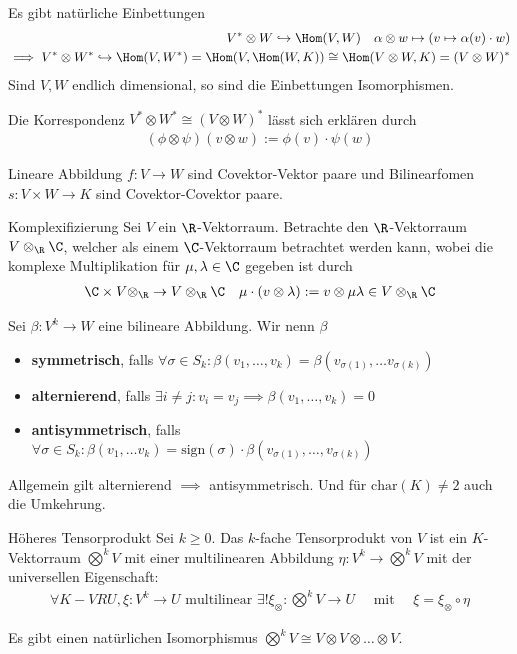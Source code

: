 \begin{proposition}{}
    Es gibt natürliche Einbettungen
    \begin{align*}
        V^* \otimes W \hookrightarrow \Hom(V,W) \quad \alpha \otimes w \mapsto (v \mapsto \alpha(v) \cdot w)\\
        \implies V^* \otimes W^* \hookrightarrow \Hom(V,W^*) = \Hom(V, \Hom(W,K)) \cong \Hom(V \otimes W,K) = (V \otimes W)^*
    \end{align*}
    Sind $V,W$ endlich dimensional, so sind die Einbettungen Isomorphismen.

    Die Korrespondenz $V^* \otimes W^* \cong (V \otimes W)^*$ lässt sich erklären durch
    \begin{align*}
        (\phi \otimes \psi)(v \otimes w) := \phi(v) \cdot \psi(w)
    \end{align*}
\end{proposition}
Lineare Abbildung $f: V \to W$ sind Covektor-Vektor paare und Bilinearfomen $s: V \times W \to K$ sind Covektor-Covektor paare.

\begin{satz}{Komplexifizierung}
    Sei $V$ ein $\R$-Vektorraum. Betrachte den $\R$-Vektorraum $V \otimes_{\R} \C$, welcher als einem $\C$-Vektorraum betrachtet werden kann, wobei die komplexe Multiplikation für $\mu, \lambda \in \C$ gegeben ist durch
    \begin{align*}
        \C \times V \otimes_{\R} \to V \otimes_{\R} \C \quad \mu \cdot (v \otimes \lambda) := v \otimes \mu \lambda \in V \otimes_{\R} \C
    \end{align*}
\end{satz}

Sei $\beta: V^k \to W$ eine bilineare Abbildung. Wir nenn $\beta$
\begin{itemize}
    \item   \textbf{symmetrisch}, falls $\forall \sigma \in S_k: \beta(v_1, \ldots, v_k) = \beta(v_{\sigma(1)}, \ldots v_{\sigma(k)})$
    \item   \textbf{alternierend}, falls $\exists i\neq j: v_i = v_j \implies \beta(v_1, \ldots, v_k) = 0$
    \item   \textbf{antisymmetrisch}, falls $\forall \sigma \in S_k: \beta(v_1, \ldots v_k) = \text{sign}(\sigma) \cdot \beta(v_{\sigma(1)}, \ldots, v_{\sigma(k)})$
\end{itemize}
Allgemein gilt alternierend $\implies$ antisymmetrisch. Und für $\text{char}(K) \neq 2$ auch die Umkehrung.

\begin{definition}{Höheres Tensorprodukt}
    Sei $k \geq 0$. Das $k$-fache Tensorprodukt von $V$ ist ein $K$-Vektorraum $\bigotimes^k V$ mit einer multilinearen Abbildung $\eta: V^k \to \bigotimes^k V$ mit der universellen Eigenschaft:
    \begin{align*}
        \forall K-VR U, \xi: V^k \to U \text{ multilinear } \exists! \xi_{\otimes}: \bigotimes^k V \to U \quad \text{ mit } \quad \xi = \xi_{\otimes} \circ \eta
    \end{align*}
\end{definition}
Es gibt einen natürlichen Isomorphismus $\bigotimes^k V \cong V \otimes V \otimes \ldots \otimes V$.

